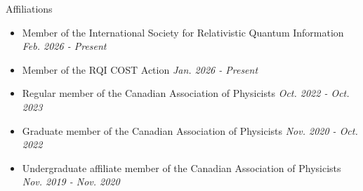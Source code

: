 \documentclass{resume} %
\begin{document}
\vspace{1em}

\begin{rSection}{Affiliations}
\begin{itemize}
\item{Member of the International Society for Relativistic Quantum Information} \hfill\textit{Feb. 2026 - Present}
\item{Member of the RQI COST Action} \hfill\textit{Jan. 2026 - Present}
\item{Regular member of the Canadian Association of Physicists} \hfill\textit{{Oct. 2022 - Oct. 2023}}
\item{Graduate member of the Canadian Association of Physicists} \hfill\textit{{Nov. 2020 - Oct. 2022}}
\item{Undergraduate affiliate member of the Canadian Association of Physicists} \hfill\textit{{Nov. 2019 - Nov. 2020}}
\end{itemize}

\end{rSection}
\end{document}
